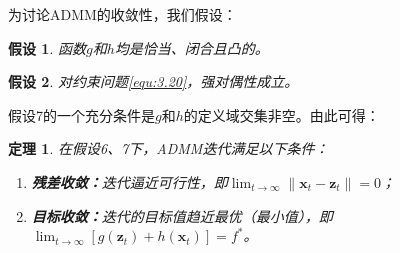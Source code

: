 \documentclass[12pt]{article}
\newtheorem{theorem}{定理}
\newtheorem{hypothesis}{假设}
\begin{document}
为讨论ADMM的收敛性，我们假设：
\begin{hypothesis}
    函数$g$和$h$均是恰当、闭合且凸的。
\end{hypothesis}
\begin{hypothesis}
    对约束问题\autoref{equ:3.20}，强对偶性成立。
\end{hypothesis}
假设7的一个充分条件是$g$和$h$的定义域交集非空。由此可得：
\begin{theorem}
    在假设6、7下，ADMM迭代满足以下条件：
    \begin{enumerate}
        \item \textbf{残差收敛：}迭代逼近可行性，即$\lim_{t\to\infty} \|\bm{x}_t-\bm{z}_t\|=0$；
        \item \textbf{目标收敛：}迭代的目标值趋近最优（最小值），即$\lim_{t\to\infty} \left[g(\bm{z}_t)+h(\bm{x}_t)\right]=f^*$。
    \end{enumerate}
\end{theorem}
\end{document}
